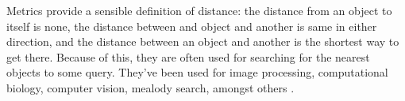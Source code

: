 Metrics provide a sensible definition of distance:
the distance from an object to itself is none,
the distance between and object and another is same in either direction,
and the distance between an object and another is the shortest way to get there.
Because of this, they are often used for searching for the nearest objects to some query.
They've been used for image processing, computational biology, computer vision, mealody search, amongst others \cite{chen}.
